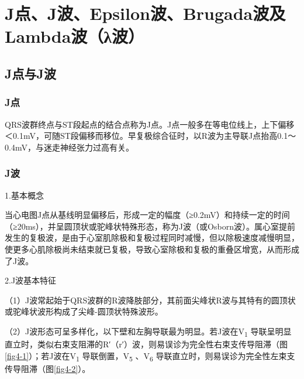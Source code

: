 \protect\hypertarget{text00010.html}{}{}

\protect\hypertarget{text00010.htmlux5cux23chapter10}{}{}

\chapter{J点、J波、Epsilon波、Brugada波及Lambda波（λ波）}

\protect\hypertarget{text00010.htmlux5cux23subid66}{}{}

\section{J点与J波}

\protect\hypertarget{text00010.htmlux5cux23subid67}{}{}

\subsection{J点}

QRS波群终点与ST段起点的结合点称为J点。J点一般多在等电位线上，上下偏移＜0.1mV，可随ST段偏移而移位。早复极综合征时，以R波为主导联J点抬高0.1～0.4mV，与迷走神经张力过高有关。

\protect\hypertarget{text00010.htmlux5cux23subid68}{}{}

\subsection{J波}

1.基本概念

当心电图J点从基线明显偏移后，形成一定的幅度（≥0.2mV）和持续一定的时间（≥20ms），并呈圆顶状或驼峰状特殊形态，称为J波（或Osborn波）。属心室提前发生的复极波，是由于心室肌除极和复极过程同时减慢，但以除极速度减慢明显，使更多心肌除极尚未结束就已复极，导致心室除极和复极的重叠区增宽，从而形成了J波。

2.J波基本特征

（1）J波常起始于QRS波群的R波降肢部分，其前面尖峰状R波与其特有的圆顶状或驼峰状波形构成了尖峰-圆顶状特殊波形。

（2）J波形态可呈多样化，以下壁和左胸导联最为明显。若J波在V\textsubscript{1}
导联呈明显直立时，类似右束支阻滞的R′（r′）波，则易误诊为完全性右束支传导阻滞（图\ref{fig4-1}）；若J波在V\textsubscript{1}
导联倒置，V\textsubscript{5} 、V\textsubscript{6}
导联直立时，则易误诊为完全性左束支传导阻滞（图\ref{fig4-2}）。

